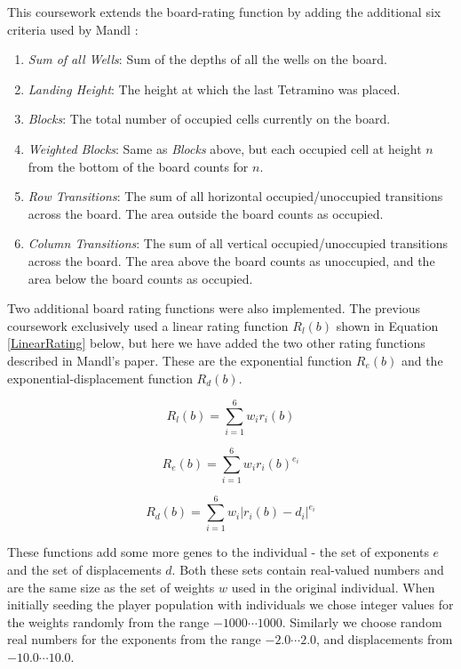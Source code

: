 \documentclass[a4paper,11pt]{article}
\newcounter{savedcounter}
\begin{document}
This coursework extends the board-rating function by adding the additional six
criteria used by Mandl \cite{Mandl2005}:

\begin{enumerate}
  \setcounter{enumi}{\thesavedcounter}
  \item \emph{Sum of all Wells}: Sum of the depths of all the wells on the board.
  \item \emph{Landing Height}: The height at which the last Tetramino was placed.
  \item \emph{Blocks}: The total number of occupied cells currently on the board.
  \item \emph{Weighted Blocks}: Same as \emph{Blocks} above, but each occupied
      cell at height $n$ from the bottom of the board counts for $n$.
  \item \emph{Row Transitions}: The sum of all horizontal occupied/unoccupied
      transitions across the board.
      The area outside the board counts as occupied.
  \item \emph{Column Transitions}: The sum of all vertical occupied/unoccupied
      transitions across the board.
      The area above the board counts as unoccupied, and the area below the
      board counts as occupied.
\end{enumerate}

Two additional board rating functions were also implemented.
The previous coursework exclusively used a linear rating function $R_l(b)$
shown in Equation \ref{LinearRating} below, but here we have added the two
other rating functions described in Mandl's paper.
These are the exponential function $R_e(b)$ and the exponential-displacement
function $R_d(b)$.


\begin{equation}
\label{LinearRating}
  R_l(b) = \sum^6_{i=1} w_ir_i(b)
\end{equation}

\begin{equation}
\label{ExponentialRating}
  R_e(b) = \sum^6_{i=1} w_ir_i(b)^{e_i}
\end{equation}

\begin{equation}
\label{DisplacementRating}
  R_d(b) = \sum^6_{i=1} w_i \lvert r_i(b) - d_i \rvert ^{e_i}
\end{equation}

These functions add some more genes to the individual - the set of exponents
$e$ and the set of displacements $d$.
Both these sets contain real-valued numbers and are the same size as the set of
weights $w$ used in the original individual.
When initially seeding the player population with individuals we chose integer
values for the weights randomly from the range $-1000 \cdots 1000$.
Similarly we choose random real numbers for the exponents from the range
$-2.0 \cdots 2.0$, and displacements from $-10.0 \cdots 10.0$.
\end{document}
